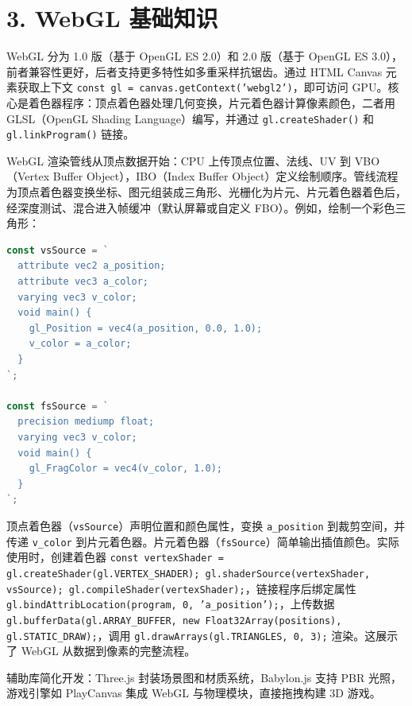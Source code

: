 \chapter{3. WebGL 基础知识}
WebGL 分为 1.0 版（基于 OpenGL ES 2.0）和 2.0 版（基于 OpenGL ES 3.0），前者兼容性更好，后者支持更多特性如多重采样抗锯齿。通过 HTML Canvas 元素获取上下文 \texttt{const gl = canvas.getContext('webgl2')}，即可访问 GPU。核心是着色器程序：顶点着色器处理几何变换，片元着色器计算像素颜色，二者用 GLSL（OpenGL Shading Language）编写，并通过 \texttt{gl.createShader()} 和 \texttt{gl.linkProgram()} 链接。\par
WebGL 渲染管线从顶点数据开始：CPU 上传顶点位置、法线、UV 到 VBO（Vertex Buffer Object），IBO（Index Buffer Object）定义绘制顺序。管线流程为顶点着色器变换坐标、图元组装成三角形、光栅化为片元、片元着色器着色后，经深度测试、混合进入帧缓冲（默认屏幕或自定义 FBO）。例如，绘制一个彩色三角形：\par
\begin{lstlisting}[language=javascript]
const vsSource = `
  attribute vec2 a_position;
  attribute vec3 a_color;
  varying vec3 v_color;
  void main() {
    gl_Position = vec4(a_position, 0.0, 1.0);
    v_color = a_color;
  }
`;

const fsSource = `
  precision mediump float;
  varying vec3 v_color;
  void main() {
    gl_FragColor = vec4(v_color, 1.0);
  }
`;
\end{lstlisting}
顶点着色器（\texttt{vsSource}）声明位置和颜色属性，变换 \texttt{a\_{}position} 到裁剪空间，并传递 \texttt{v\_{}color} 到片元着色器。片元着色器（\texttt{fsSource}）简单输出插值颜色。实际使用时，创建着色器 \texttt{const vertexShader = gl.createShader(gl.VERTEX\_{}SHADER); gl.shaderSource(vertexShader, vsSource); gl.compileShader(vertexShader);}，链接程序后绑定属性 \texttt{gl.bindAttribLocation(program, 0, 'a\_{}position');}，上传数据 \texttt{gl.bufferData(gl.ARRAY\_{}BUFFER, new Float32Array(positions), gl.STATIC\_{}DRAW);}，调用 \texttt{gl.drawArrays(gl.TRIANGLES, 0, 3);} 渲染。这展示了 WebGL 从数据到像素的完整流程。\par
辅助库简化开发：Three.js 封装场景图和材质系统，Babylon.js 支持 PBR 光照，游戏引擎如 PlayCanvas 集成 WebGL 与物理模块，直接拖拽构建 3D 游戏。\par
